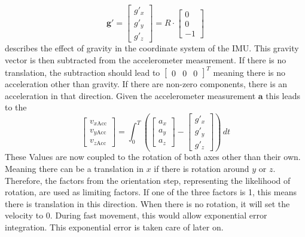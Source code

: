 \documentclass[letterpaper, 10 pt, conference]{ieeeconf}  %
\newcommand{\V}[1]{\mathbf{#1}} %
\begin{document}
\begin{equation}
\V g\V '=\begin{bmatrix}
g'_x\\
g'_y\\
g'_z
\end{bmatrix}
= R \cdot \begin{bmatrix}
0 \\0  \\ - 1
\end{bmatrix}
\end{equation}
describes the effect of gravity in the coordinate system of the IMU.
This gravity vector is then subtracted from the accelerometer measurement. If there is no translation, the subtraction should lead to $\begin{bmatrix}
0 & 0&0
\end{bmatrix}^T$ meaning there is no acceleration other than gravity. If there are non-zero components, there is an acceleration in that direction. Given the accelerometer measurement $\V a$ this leads to the 
\begin{equation}
\begin{bmatrix}
v_{x\text{Acc}} \\ v_{y\text{Acc}} \\v_{z\text{Acc}} 
\end{bmatrix}
= 
\int_0^T \left(\begin{bmatrix}
a_x \\ a_y \\ a_z
\end{bmatrix} 
-  \begin{bmatrix}
g'_x\\
g'_y\\
g'_z
\end{bmatrix} \right)\, dt
\end{equation}
These Values are now coupled to the rotation of both axes other than their own. Meaning there can be a translation in $x$ if there is rotation around $y$ or $z$.
Therefore, the factors from the orientation step, representing the likelihood of rotation, are used as limiting factors.
If one of the three factors is 1, this means there is translation in this direction.
When there is no rotation, it will set the velocity to 0.
During fast movement, this would allow exponential error integration. 
This exponential error is taken care of later on.
\end{document}
